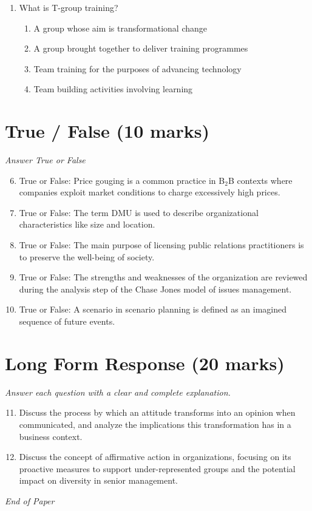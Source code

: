 \documentclass[12pt]{article}
\begin{document}
\begin{enumerate}[label=\arabic*.]
\begin{enumerate}[label=(\alph*)]
    \item Convenience.
\end{enumerate}
\item What is T-group training?
\begin{enumerate}[label=(\alph*)]
    \item A group whose aim is transformational change
    \item A group brought together to deliver training programmes
    \item Team training for the purposes of advancing technology
    \item Team building activities involving learning
\end{enumerate}
\end{enumerate}

\section*{True / False (10 marks)}
\textit{Answer True or False}
\begin{enumerate}[label=\arabic*.]
\setcounter{enumi}{5}
\item True or False: Price gouging is a common practice in B$_{2}$B contexts where companies exploit market conditions to charge excessively high prices.
\item True or False: The term DMU is used to describe organizational characteristics like size and location.
\item True or False: The main purpose of licensing public relations practitioners is to preserve the well-being of society.
\item True or False: The strengths and weaknesses of the organization are reviewed during the analysis step of the Chase Jones model of issues management.
\item True or False: A scenario in scenario planning is defined as an imagined sequence of future events.
\end{enumerate}

\section*{Long Form Response (20 marks)}
\textit{Answer each question with a clear and complete explanation.}
\begin{enumerate}[label=\arabic*.]
\setcounter{enumi}{10}
\item Discuss the process by which an attitude transforms into an opinion when communicated, and analyze the implications this transformation has in a business context.
\item Discuss the concept of affirmative action in organizations, focusing on its proactive measures to support under-represented groups and the potential impact on diversity in senior management.
\end{enumerate}

\vfill
\noindent\textit{End of Paper}
\end{document}
